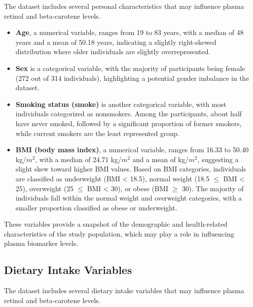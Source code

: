 \documentclass[12pt]{article}
\providecommand{\tightlist}{%
  \setlength{\itemsep}{0pt}\setlength{\parskip}{0pt}}
\begin{document}
The dataset includes several personal characteristics that may influence
plasma retinol and beta-carotene levels.

\begin{itemize}
\tightlist
\item
  \textbf{Age}, a numerical variable, ranges from 19 to 83 years, with a
  median of 48 years and a mean of 50.18 years, indicating a slightly
  right-skewed distribution where older individuals are slightly
  overrepresented.
\item
  \textbf{Sex} is a categorical variable, with the majority of
  participants being female (272 out of 314 individuals), highlighting a
  potential gender imbalance in the dataset.
\item
  \textbf{Smoking status (smoke)} is another categorical variable, with
  most individuals categorized as nonsmokers. Among the participants,
  about half have never smoked, followed by a significant proportion of
  former smokers, while current smokers are the least represented group.
\item
  \textbf{BMI (body mass index)}, a numerical variable, ranges from
  16.33 to 50.40 kg/\(m^2\), with a median of 24.71 kg/\(m^2\) and a
  mean of kg/\(m^2\), suggesting a slight skew toward higher BMI values.
  Based on BMI categories, individuals are classified as underweight
  (BMI \textless{} 18.5), normal weight (18.5 \(\leq\) BMI \textless{}
  25), overweight (25 \(\leq\) BMI \textless{} 30), or obese (BMI
  \(\geq\) 30). The majority of individuals fall within the normal
  weight and overweight categories, with a smaller proportion classified
  as obese or underweight.
\end{itemize}

These variables provide a snapshot of the demographic and health-related
characteristics of the study population, which may play a role in
influencing plasma biomarker levels.

\subsection{Dietary Intake Variables}\label{dietary-intake-variables}

The dataset includes several dietary intake variables that may influence
plasma retinol and beta-carotene levels.
\end{document}
